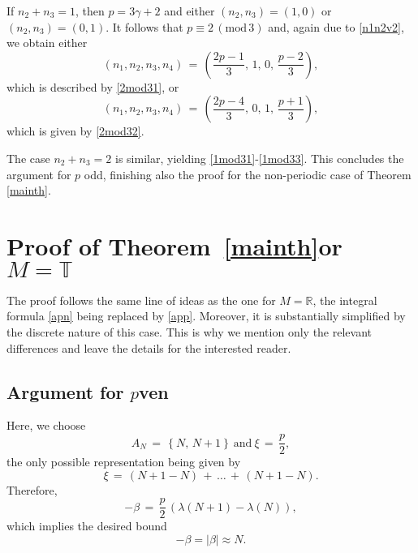 \documentclass{amsart}
\newcommand{\R}{\mathbb{R}}
\begin{document}
If $n_2+n_3=1$, then $p=3\gamma+2$ and either $(n_2,n_3)=(1,0)$ or $(n_2,n_3)=(0,1)$. It follows that $ p\equiv 2\, (\text{mod}\,3)$ and, again due to \eqref{n1n2v2}, we obtain either
\[
(n_1,n_2,n_3,n_4)\,=\,\left(\frac{2p-1}{3},\,1,\,0,\,\frac{p-2}{3}\right),
\]
which is described by \eqref{2mod31}, or
\[
(n_1,n_2,n_3,n_4)\,=\,\left(\frac{2p-4}{3},\,0,\,1,\,\frac{p+1}{3}\right),
\]
which is given by \eqref{2mod32}.

The case $n_2+n_3=2$ is similar, yielding \eqref{1mod31}-\eqref{1mod33}. This concludes the argument for $p$ odd, finishing also the proof for the non-periodic case of Theorem \ref{mainth}.


\section{Proof of Theorem~\texorpdfstring{\ref{mainth}{}} for \texorpdfstring{$M=\mathbb{T}$}{}}
The proof follows the same line of ideas as the one for $M=\R$, the integral formula \eqref{apn} being replaced by \eqref{app}. Moreover, it is substantially simplified by the discrete nature of this case. This is why we mention only the relevant differences and leave the details for the interested reader.

\subsection{Argument for \texorpdfstring{$p$} even} Here, we choose
\[
A_N\,=\,\left\{N,\, N+1\right\}\ \text{and} \ \xi\,=\,\frac{p}{2},
\]
the only possible representation being given by
\[
\xi\,=\,(N+1-N)\,+\,\ldots\,+\, (N+1-N).
\]
Therefore,
\[
-\beta\,=\,\frac{p}{2}\, \left(\lambda(N+1)-\lambda (N)\right),
\]
which implies the desired bound
\[
-\beta= |\beta| \approx N.
\]
\end{document}
